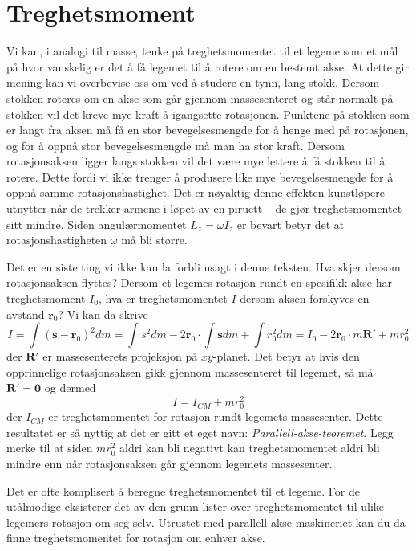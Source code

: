 \documentclass[twoside,utf8]{article}
\begin{document}
\section{Treghetsmoment}
Vi kan, i analogi til masse, tenke på treghetsmomentet til et legeme som et mål på hvor vanskelig er det å få legemet til å rotere om en bestemt akse. At dette gir mening kan vi overbevise oss om ved å studere en tynn, lang stokk. Dersom stokken roteres om en akse som går gjennom massesenteret og står normalt på stokken vil det kreve mye kraft å igangsette rotasjonen. Punktene på stokken som er langt fra aksen må få en stor bevegelsesmengde for å henge med på rotasjonen, og for å oppnå stor bevegelsesmengde må man ha stor kraft. Dersom rotasjonsaksen ligger langs stokken vil det være mye lettere å få stokken til å rotere. Dette fordi vi ikke trenger å produsere like mye bevegelsesmengde for å oppnå samme rotasjonshastighet. Det er nøyaktig denne effekten kunstløpere utnytter når de trekker armene i løpet av en piruett -- de gjør treghetsmomentet sitt mindre. Siden angulærmomentet $L_z=\omega I_z$ er bevart betyr det at rotasjonshastigheten $\omega$ må bli større.

\par

Det er en siste ting vi ikke kan la forbli usagt i denne teksten. Hva skjer dersom rotasjonsaksen flyttes? Dersom et legemes rotasjon rundt en spesifikk akse har treghetsmoment $I_0$, hva er treghetsmomentet $I$ dersom aksen forskyves en avstand $\mathbf{r}_0$?
Vi kan da skrive
\[
I = \int (\mathbf{s}-\mathbf{r}_0)^2 dm
= \int s^2 dm - 2\mathbf{r}_0\cdot \int \mathbf{s}  dm + \int r_0^2 dm
= I_0 - 2\mathbf{r}_0\cdot m\mathbf{R}' + mr_0^2
\]
der $\mathbf{R}'$ er massesenterets projeksjon på $xy$-planet. Det betyr at hvis den opprinnelige rotasjonsaksen gikk gjennom massesenteret til legemet, så må $\mathbf{R}'=\mathbf{0}$ og dermed
\[
I =  I_{CM} + mr_0^2
\]
der $I_{CM}$ er treghetsmomentet for rotasjon rundt legemets massesenter. Dette resultatet er så nyttig at det er gitt et eget navn: {\it Parallell-akse-teoremet}. Legg merke til at siden $mr_0^2$ aldri kan bli negativt kan treghetsmomentet aldri bli mindre enn når rotasjonsaksen går gjennom legemets massesenter.

Det er ofte komplisert å beregne treghetsmomentet til et legeme. For de utålmodige eksisterer det av den grunn lister over treghetsmomentet til ulike legemers rotasjon om seg selv. Utrustet med parallell-akse-maskineriet kan du da finne treghetsmomentet for rotasjon om enhver akse.
\end{document}
